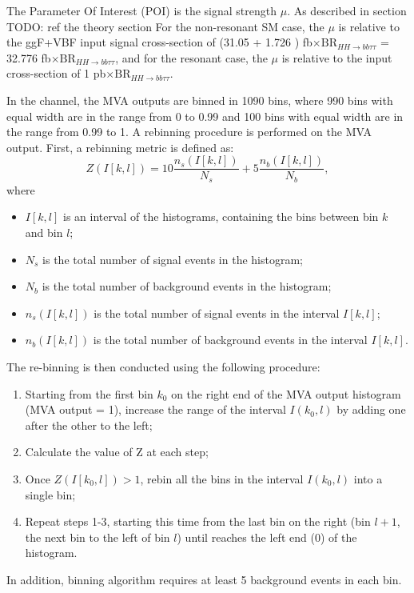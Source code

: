 The Parameter Of Interest (POI) is the signal strength $\mu$.  
As described in section TODO: ref the theory section For the non-resonant SM case, the $\mu$ is relative to the ggF+VBF input signal cross-section 
of (31.05 + 1.726 ) fb$\times \text{BR}_{HH\rightarrow bb\tau\tau}$ =  32.776 fb$\times \text{BR}_{HH\rightarrow bb\tau\tau}$,
and for the resonant case,  the $\mu$  is relative to the input cross-section of 1 pb$\times \text{BR}_{HH\rightarrow bb\tau\tau}$.

In the \lephad channel, the MVA outputs are binned in 1090 bins, where 990 bins with equal width are in the range from 0 to 0.99 
and 100 bins with equal width are in the range from 0.99 to 1.
A rebinning procedure is performed on the MVA output. 
First, a rebinning metric is defined as:
\begin{equation}
Z(I[k,l]) = 10 \frac{n_{s}(I[k,l])}{N_{s}} + 5 \frac{n_{b}(I[k,l])}{N_{b}},
\end{equation}
where
\begin{itemize}
\item $I[k,l]$ is an interval of the histograms, containing the bins between bin $k$ and bin $l$;
\item $N_{s}$ is the total number of signal events in the histogram;
\item $N_{b}$ is the total number of background events in the histogram;
\item $n_{s}(I[k,l])$ is the total number of signal events in the interval $I[k,l]$;
\item $n_{b}(I[k,l])$ is the total number of background events in the interval $I[k,l]$.
\end{itemize}
The re-binning is then conducted using the following procedure:
\begin{enumerate}
\item Starting from the first bin $k_0$ on the right end of the MVA output histogram (MVA output = 1), 
increase the range of the interval $I(k_0, l)$ 
by adding one after the other to the left;
\item Calculate the value of Z at each step;
\item Once $Z(I[k_{0}, l]) > 1$, rebin all the bins in the interval $I(k_{0}, l)$ into a single bin;
\item Repeat steps 1-3, starting this time from the last bin on the right (bin $l+1$, the next bin to the left of bin $l$)
until reaches the left end (0) of the histogram.
\end{enumerate}
In addition, binning algorithm requires at least 5 background events in each bin. 

